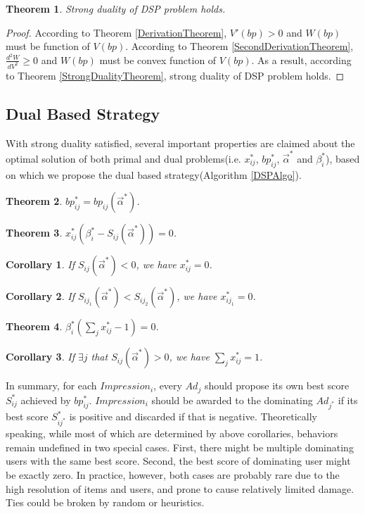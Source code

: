 \documentclass{article}
\newtheorem{theorem}{Theorem}[section]
\newtheorem{corollary}{Corollary}[theorem]
\newcommand{\sx}{x_{ij}}
\newcommand{\sbp}{bp_{ij}}
\newcommand{\sbeta}{\beta_i}
\newcommand{\sS}{S_{ij}}
\newcommand{\valpha}{\vec{\alpha}}
\begin{document}
\begin{theorem} \label{DSPStrongDualityTheorem}
Strong duality of DSP problem holds.
\end{theorem}

\begin{proof}
According to Theorem \ref{DerivationTheorem}, $V'(bp)>0$ and $W(bp)$ must be function of $V(bp)$.
According to Theorem \ref{SecondDerivationTheorem}, $\frac{d^2W}{dV^2}\ge0$ and $W(bp)$ must be convex function of $V(bp)$.
As a result, according to Theorem \ref{StrongDualityTheorem}, strong duality of DSP problem holds.
\end{proof}

\subsection{Dual Based Strategy} \label{DSPDualBasedStrategy}

With strong duality satisfied, several important properties
    are claimed about the optimal solution of both primal and dual problems(i.e. $\sx^*$, $\sbp^*$, $\valpha^*$ and $\sbeta^*$),
    based on which we propose the dual based strategy(Algorithm \ref{DSPAlgo}).

\begin{theorem}
$\sbp^* = \sbp(\valpha^*)$.
\end{theorem}

\begin{theorem}
$\sx^*(\sbeta^* - \sS(\valpha^*)) = 0$.
\end{theorem}

\begin{corollary}
If $\sS(\valpha^*) < 0$, we have $\sx^* = 0$.
\end{corollary}

\begin{corollary}
If $S_{ij_1}(\valpha^*) < S_{ij_2}(\valpha^*)$, we have $x_{ij_1}^* = 0$.
\end{corollary}

\begin{theorem}
$\sbeta^*(\sum\limits_j \sx^* - 1) = 0$.
\end{theorem}

\begin{corollary}
If $\exists j$ that $\sS(\valpha^*) > 0$, we have $\sum\limits_j \sx^* = 1$.
\end{corollary}

In summary, for each $Impression_i$, every $Ad_j$ should propose its own best score $\sS^*$ achieved by $\sbp^*$.
$Impression_i$ should be awarded to the dominating $Ad_{j^*}$ if its best score $S_{ij^*}^*$ is positive and discarded if that is negative.
Theoretically speaking, while most of which are determined by above corollaries, behaviors remain undefined in two special cases.
First, there might be multiple dominating users with the same best score.
Second, the best score of dominating user might be exactly zero.
In practice, however, both cases are probably rare due to the high resolution of items and users, and prone to cause relatively limited damage.
Ties could be broken by random or heuristics.
\end{document}
